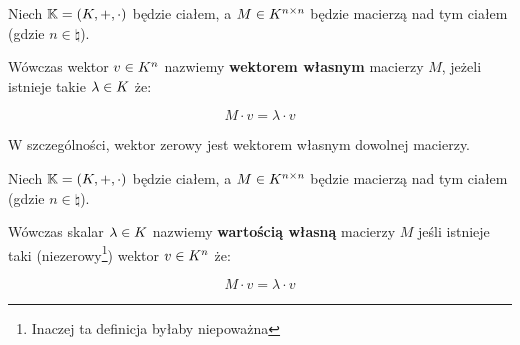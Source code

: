 \begin{definition}
	Niech \(\mathbb{K} = (K, +, \cdot)\) będzie ciałem, a \(M \in K^{n \times n}\) będzie macierzą nad tym ciałem (gdzie \(n \in \natural\)).

	Wówczas wektor \(v \in K^n\) nazwiemy \textbf{wektorem własnym} macierzy \(M\), jeżeli istnieje takie \(\lambda \in K\) że:

	\[
		M \cdot v = \lambda \cdot v
	\]

	W szczególności, wektor zerowy jest wektorem własnym dowolnej macierzy.
\end{definition}
\begin{definition}
	Niech \(\mathbb{K} = (K, +, \cdot)\) będzie ciałem, a \(M \in K^{n \times n}\) będzie macierzą nad tym ciałem (gdzie \(n \in \natural\)).

	Wówczas skalar \( \lambda \in K\) nazwiemy \textbf{wartością własną} macierzy \(M\) jeśli istnieje taki (niezerowy\footnote{Inaczej ta definicja byłaby niepoważna}) wektor \(v \in K^n\) że:

	\[
		M \cdot v = \lambda \cdot v
	\]
\end{definition}
